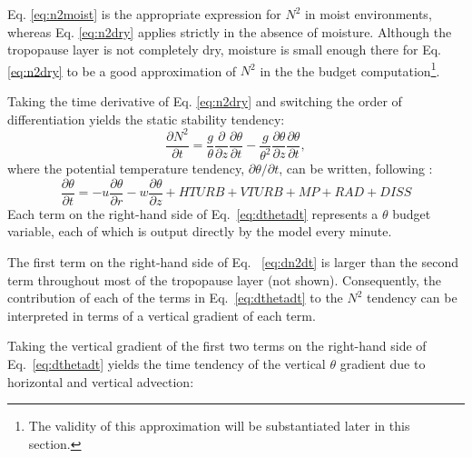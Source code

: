 \documentclass{ametsoc}
\begin{document}
Eq. \ref{eq:n2moist} is the appropriate expression for $N^2$ in moist environments, whereas Eq. \ref{eq:n2dry} applies strictly in the absence of moisture.
Although the tropopause layer is not completely dry, moisture is small enough there for Eq. \ref{eq:n2dry} to be a good approximation of $N^2$ in the the budget computation\footnote{The validity of this approximation will be substantiated later in this section.}.

Taking the time derivative of Eq. \ref{eq:n2dry} and switching the order of differentiation yields the static stability tendency:
   \begin{equation} \label{eq:dn2dt}
   \frac{\partial N^2}{\partial t} = \frac{g}{\theta}\frac{\partial}{\partial z}\frac{\partial \theta}{\partial t}-\frac{g}{\theta^2}\frac{\partial \theta}{\partial z}\frac{\partial \theta}{\partial t},
   \end{equation}
where the potential temperature tendency, $\partial \theta/\partial t$, can be written, following \cite{Bryan2017}:
   \begin{equation} \label{eq:dthetadt}
   \frac{\partial \theta}{\partial t} = -u\frac{\partial\theta}{\partial r}-w\frac{\partial \theta}{\partial z}+HTURB+VTURB+MP+RAD+DISS
   \end{equation}
Each term on the right-hand side of Eq.~\ref{eq:dthetadt} represents a $\theta$ budget variable, each of which is output directly by the model every minute.

The first term on the right-hand side of Eq. ~\ref{eq:dn2dt} is larger than the second term throughout most of the tropopause layer (not shown).
Consequently, the contribution of each of the terms in Eq.~\ref{eq:dthetadt} to the $N^2$ tendency can be interpreted in terms of a vertical gradient of each term.

Taking the vertical gradient of the first two terms on the right-hand side of Eq.~\ref{eq:dthetadt} yields the time tendency of the vertical $\theta$ gradient due to horizontal and vertical advection:%
\end{document}
